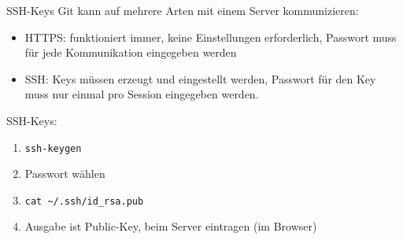 \begin{frame}{SSH-Keys}
  Git kann auf mehrere Arten mit einem Server kommunizieren:
  \begin{itemize}
    \item HTTPS: funktioniert immer, keine Einstellungen erforderlich, Passwort muss für jede Kommunikation eingegeben werden
    \item SSH: Keys müssen erzeugt und eingestellt werden, Passwort für den Key muss nur einmal pro Session eingegeben werden.
  \end{itemize}

  SSH-Keys:
  \begin{enumerate}
    \item \texttt{ssh-keygen}
    \item Passwort wählen
    \item \texttt{cat \textasciitilde/.ssh/id\_rsa.pub}
    \item Ausgabe ist Public-Key, beim Server eintragen (im Browser)
  \end{enumerate}
\end{frame}
